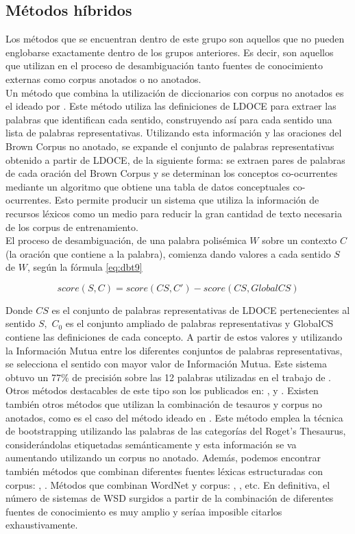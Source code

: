 \subsection{Métodos híbridos}
Los métodos que se encuentran dentro de este grupo son aquellos que no pueden englobarse exactamente dentro de los grupos anteriores. Es decir, son aquellos que utilizan en el proceso de desambiguación tanto fuentes de conocimiento externas como corpus anotados o no anotados.\\
Un método que combina la utilización de diccionarios con corpus no anotados es el ideado por \cite{045}. Este método utiliza las definiciones de LDOCE para extraer las palabras que identifican cada sentido, construyendo así para cada sentido una lista de palabras representativas. Utilizando esta información y las oraciones del Brown Corpus \cite{046} no anotado, se expande el conjunto de palabras representativas obtenido a partir de LDOCE, de la siguiente forma: se extraen pares de palabras de cada oración del Brown Corpus y se determinan los conceptos co-ocurrentes mediante un algoritmo que obtiene una tabla de datos conceptuales co-ocurrentes. Esto permite producir un sistema que utiliza la información de recursos léxicos como un medio para reducir la gran cantidad de texto necesaria de los corpus de entrenamiento.\\
El proceso de desambiguación,  de una palabra polisémica $W$ sobre un contexto $C$ (la oración que contiene a la palabra), comienza dando valores a cada sentido $S$ de $W$, según la fórmula \ref{eq:dbt9}

\begin{equation}
  score(S,C)=score(CS,C')-score(CS,GlobalCS)
  \label{eq:dbt9}
\end{equation}

Donde $CS$ es el conjunto de palabras representativas de LDOCE pertenecientes al sentido $S,$ $C_0$ es el conjunto ampliado de palabras representativas y GlobalCS contiene las definiciones de cada concepto. A partir de estos valores y utilizando la Información Mutua entre los diferentes conjuntos de palabras representativas, se selecciona el sentido con mayor valor de Información Mutua. Este sistema obtuvo un 77\% de precisión sobre las 12 palabras utilizadas en el trabajo de \cite{047}.\\
Otros métodos destacables de este tipo son los publicados en: \cite{048}, \cite{049} y \cite{050}. Existen también otros métodos que utilizan la combinación de tesauros y corpus no anotados, como es el caso del método ideado en \cite{047}. Este método emplea la técnica de bootstrapping utilizando las palabras de las categorías del Roget’s Thesaurus, considerándolas etiquetadas semánticamente y esta información se va aumentando utilizando un corpus no anotado. Además, podemos encontrar también métodos que combinan diferentes fuentes léxicas estructuradas con corpus: \cite{051}, \cite{052}. Métodos que combinan WordNet y corpus: \cite{053}, \cite{054}, etc. En definitiva, el número de sistemas de WSD surgidos a partir de la combinación de diferentes fuentes de conocimiento es muy amplio y seríaa imposible citarlos exhaustivamente.


